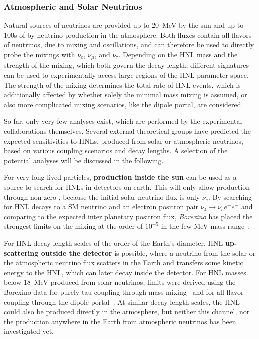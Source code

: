 \subsubsection{Atmospheric and Solar Neutrinos}

Natural sources of neutrinos are provided up to \SI{20}{\mega\electronvolt} by the sun and up to 100s of \si{\gev} by neutrino production in the atmosphere. Both fluxes contain all flavors of neutrinos, due to mixing and oscillations, and can therefore be used to directly probe the mixings with $\nu_e$, $\nu_\mu$, and $\nu_\tau$. Depending on the HNL mass and the strength of the mixing, which both govern the decay length, different signatures can be used to experimentally access large regions of the HNL parameter space. The strength of the mixing determines the total rate of HNL events, which is additionally affected by whether solely the minimal mass mixing is assumed, or also more complicated mixing scenarios, like the dipole portal, are considered.

So far, only very few analyses exist, which are performed by the experimental collaborations themselves. Several external theoretical groups have predicted the expected sensitivities to HNLs, produced from solar or atmospheric neutrinos, based on various coupling scenarios and decay lengths. A selection of the potential analyses will be discussed in the following.

For very long-lived particles, \textbf{production inside the sun} can be used as a source to search for HNLs in detectors on earth. This will only allow production through non-zero , because the initial solar neutrino flux is only $\nu_e$. By searching for HNL decays to a SM neutrino and an electron positron pair $\nu_4 \rightarrow \nu_e e^+ e^-$ and comparing to the expected inter planetary positron flux, \textit{Borexino} has placed the strongest limits on the mixing  at the order of $10^{-5}$ in the few \si{\mega\electronvolt} mass range~.

For HNL decay length scales of the order of the Earth's diameter, HNL \textbf{up-scattering outside the detector} is possible, where a neutrino from the solar or the atmospheric neutrino flux scatters in the Earth and transfers some kinetic energy to the HNL, which can later decay inside the detector. For HNL masses below \SI{18}{\mega\electronvolt} produced from solar neutrinos, limits were derived using the Borexino data for purely tau coupling through mass mixing~ and for all flavor coupling through the dipole portal~. At similar decay length scales, the HNL could also be produced directly in the atmosphere, but neither this channel, nor the production anywhere in the Earth from atmospheric neutrinos has been investigated yet.

